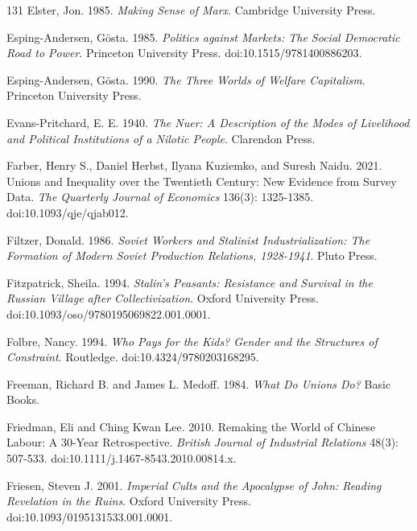 \documentclass[11pt,letterpaper]{article}
\theoremstyle{definition}
\theoremstyle{remark}
\begin{document}
\begin{thebibliography}{131}
Elster, Jon. 1985. \emph{Making Sense of Marx}. Cambridge University Press.

Esping-Andersen, G\"osta. 1985. \emph{Politics against Markets: The Social Democratic Road to Power}. Princeton University Press. doi:10.1515/9781400886203.

Esping-Andersen, G\"osta. 1990. \emph{The Three Worlds of Welfare Capitalism}. Princeton University Press.

Evans-Pritchard, E. E. 1940. \emph{The Nuer: A Description of the Modes of Livelihood and Political Institutions of a Nilotic People}. Clarendon Press.

Farber, Henry S., Daniel Herbst, Ilyana Kuziemko, and Suresh Naidu. 2021. Unions and Inequality over the Twentieth Century: New Evidence from Survey Data. \emph{The Quarterly Journal of Economics} 136(3): 1325-1385. doi:10.1093/qje/qjab012.

Filtzer, Donald. 1986. \emph{Soviet Workers and Stalinist Industrialization: The Formation of Modern Soviet Production Relations, 1928-1941}. Pluto Press.

Fitzpatrick, Sheila. 1994. \emph{Stalin's Peasants: Resistance and Survival in the Russian Village after Collectivization}. Oxford University Press. doi:10.1093/oso/9780195069822.001.0001.

Folbre, Nancy. 1994. \emph{Who Pays for the Kids? Gender and the Structures of Constraint}. Routledge. doi:10.4324/9780203168295.

Freeman, Richard B. and James L. Medoff. 1984. \emph{What Do Unions Do?} Basic Books.

Friedman, Eli and Ching Kwan Lee. 2010. Remaking the World of Chinese Labour: A 30-Year Retrospective. \emph{British Journal of Industrial Relations} 48(3): 507-533. doi:10.1111/j.1467-8543.2010.00814.x.

Friesen, Steven J. 2001. \emph{Imperial Cults and the Apocalypse of John: Reading Revelation in the Ruins}. Oxford University Press. doi:10.1093/0195131533.001.0001.


\end{thebibliography}
\end{document}
